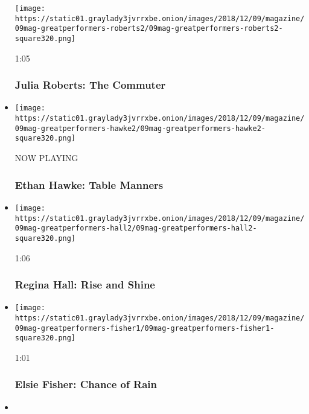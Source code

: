 \begin{itemize}
  \texttt{[image: https://static01.graylady3jvrrxbe.onion/images/2018/12/09/magazine/09mag-greatperformers-roberts2/09mag-greatperformers-roberts2-square320.png]}

  1:05

  \hypertarget{julia-roberts-the-commuter}{%
  \subsubsection{Julia Roberts: The
  Commuter}\label{julia-roberts-the-commuter}}
\item
  \texttt{[image: https://static01.graylady3jvrrxbe.onion/images/2018/12/09/magazine/09mag-greatperformers-hawke2/09mag-greatperformers-hawke2-square320.png]}

  NOW PLAYING

  \hypertarget{ethan-hawke-table-manners-1}{%
  \subsubsection{Ethan Hawke: Table
  Manners}\label{ethan-hawke-table-manners-1}}
\item
  \href{https://www.nytimes3xbfgragh.onion/video/magazine/100000006246795/regina-hall-rise-and-shine.html?action=click\&module=video-series-bar\&region=header\&pgtype=Article\&playlistId=video/great-performers}{}

  \texttt{[image: https://static01.graylady3jvrrxbe.onion/images/2018/12/09/magazine/09mag-greatperformers-hall2/09mag-greatperformers-hall2-square320.png]}

  1:06

  \hypertarget{regina-hall-rise-and-shine}{%
  \subsubsection{Regina Hall: Rise and
  Shine}\label{regina-hall-rise-and-shine}}
\item
  \href{https://www.nytimes3xbfgragh.onion/video/magazine/100000006246777/elsie-fisher-chance-of-rain.html?action=click\&module=video-series-bar\&region=header\&pgtype=Article\&playlistId=video/great-performers}{}

  \texttt{[image: https://static01.graylady3jvrrxbe.onion/images/2018/12/09/magazine/09mag-greatperformers-fisher1/09mag-greatperformers-fisher1-square320.png]}

  1:01

  \hypertarget{elsie-fisher-chance-of-rain}{%
  \subsubsection{Elsie Fisher: Chance of
  Rain}\label{elsie-fisher-chance-of-rain}}
\item
  \href{https://www.nytimes3xbfgragh.onion/video/magazine/100000006246697/olivia-colman-emma-stone-and-rachel-weisz-coffee-to-go.html?action=click\&module=video-series-bar\&region=header\&pgtype=Article\&playlistId=video/great-performers}{}


\end{itemize}
